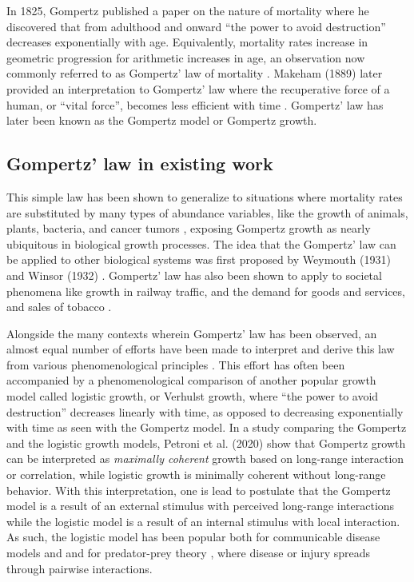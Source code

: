 \documentclass{article}
\begin{document}
In 1825, Gompertz published a paper on the nature of mortality where he discovered that from adulthood and onward ``the power to avoid destruction'' decreases exponentially with age. Equivalently, mortality rates increase in geometric progression for arithmetic increases in age, an observation now commonly referred to as Gompertz' law of mortality \cite{Gompertz1825}. Makeham (1889) later provided an interpretation to Gompertz' law where the recuperative force of a human, or ``vital force'', becomes less efficient with time \cite{makeham1889further}. Gompertz' law has later been known as the Gompertz model or Gompertz growth. 

\subsection{Gompertz' law in existing work}
This simple law has been shown to generalize to situations where mortality rates are substituted by many types of abundance variables, like the growth of animals, plants, bacteria, and cancer tumors \cite{weymouth1931relative,weymouth1931age,laird1964dynamics,zwietering1990modeling,skinner1994mathematical,starck1998avian,aggrey2002comparison,paine2012fit,benzekry2014classical,halmi2014evaluation,tjorve2010shapes}, exposing Gompertz growth as nearly ubiquitous in biological growth processes. The idea that the Gompertz' law can be applied to other biological systems was first proposed by Weymouth (1931) \cite{weymouth1931relative,weymouth1931age} and Winsor (1932) \cite{Winsor1932}. Gompertz' law has also been shown to apply to societal phenomena like growth in railway traffic, and the demand for goods and services, and sales of tobacco \cite{olshansky1997ever,prescott1922law,peabody1924growth}.

Alongside the many contexts wherein Gompertz' law has been observed, an almost equal number of efforts have been made to interpret and derive this law from various phenomenological principles \cite{bajzer1997mathematical}. This effort has often been accompanied by a phenomenological comparison of another popular growth model called logistic growth, or Verhulst growth, where ``the power to avoid destruction'' decreases linearly with time, as opposed to decreasing exponentially with time as seen with the Gompertz model. In a study comparing the Gompertz and the logistic growth models, Petroni et al. (2020) \cite{petroni2020logistic} show that Gompertz growth can be interpreted as \textit{maximally coherent} growth based on long-range interaction or correlation, while logistic growth is minimally coherent without long-range behavior. With this interpretation, one is lead to postulate that the Gompertz model is a result of an external stimulus with perceived long-range interactions while the logistic model is a result of an internal stimulus with local interaction. As such, the logistic model has been popular both for communicable disease models \cite{harko2014exact,kroger2020analytical,schlickeiser2021analytical,heng2020approximately} and and for predator-prey theory \cite{berryman1992orgins}, where disease or injury spreads through pairwise interactions. 
\end{document}
